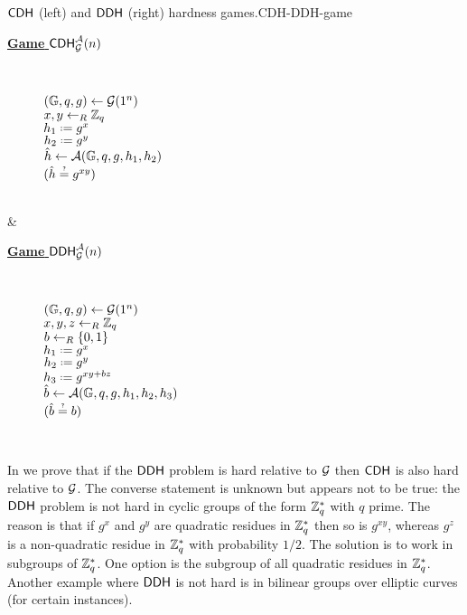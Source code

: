 \begin{boxfigTwo}{$\mathsf{CDH}$ (left) and $\mathsf{DDH}$ (right) hardness games.}{CDH-DDH-game}
\begin{minipage}{0.45\textwidth}
    \smallskip
	\begin{description}
 	\item[\underline{\textbf{Game} $\mathsf{CDH}_{\operatorname{\mathcal{G}}}^{\mathcal{A}}(n)$}] ~
 	
 		$(\mathbb{G},q,g)\leftarrow\operatorname{\mathcal{G}}(1^n)$ \\
 		$x,y\leftarrow_R \mathbb{Z}_q$ \\
 		$h_1 \defeq g^x$ \\
 		$h_2 \defeq g^y$ \\
		$\hat{h}\leftarrow\mathcal{A}(\mathbb{G},q,g,h_1,h_2)$ \\
		\Ret $\askequal{\hat{h}}{g^{xy}}$ \\
		\vphantom{Empty line} \\
		\vphantom{Empty line}
		\smallskip
  	\end{description}
\end{minipage}
    & 
\begin{minipage}{0.45\textwidth}
    \smallskip
	\begin{description}
 	\item[\underline{\textbf{Game} $\mathsf{DDH}_{\operatorname{\mathcal{G}}}^{\mathcal{A}}(n)$}] ~
 	
		$(\mathbb{G},q,g)\leftarrow\operatorname{\mathcal{G}}(1^n)$ \\
 		$x,y,z\leftarrow_R \mathbb{Z}_q$ \\
 		$b\leftarrow_R\left\{0,1\right\}$ \\
 		$h_1 \defeq g^x$ \\
 		$h_2 \defeq g^y$ \\
 		$h_3 \defeq g^{xy+bz}$ \\
		$\hat{b}\leftarrow\mathcal{A}(\mathbb{G},q,g,h_1,h_2,h_3)$ \\
		\Ret $\askequal{\hat{b}}{b}$
		\smallskip
  	\end{description}
\end{minipage}
     \\ 
\end{boxfigTwo}

In  we prove that if the $\mathsf{DDH}$ problem is hard relative to $\operatorname{\mathcal{G}}$ then $\mathsf{CDH}$ is also hard relative to $\operatorname{\mathcal{G}}$. The converse statement is unknown but appears not to be true: the $\mathsf{DDH}$ problem is not hard in cyclic groups of the form $\mathbb{Z}_q^*$ with $q$ prime. The reason is that if $g^x$ and $g^y$ are quadratic residues in $\mathbb{Z}_q^*$ then so is $g^{xy}$, whereas $g^z$ is a non-quadratic residue in $\mathbb{Z}_q^*$ with probability $1/2$. The solution is to work in subgroups of $\mathbb{Z}_q^*$. One option is the subgroup of all quadratic residues in $\mathbb{Z}_q^*$. Another example where $\mathsf{DDH}$ is not hard is in bilinear groups over elliptic curves (for certain instances). 

